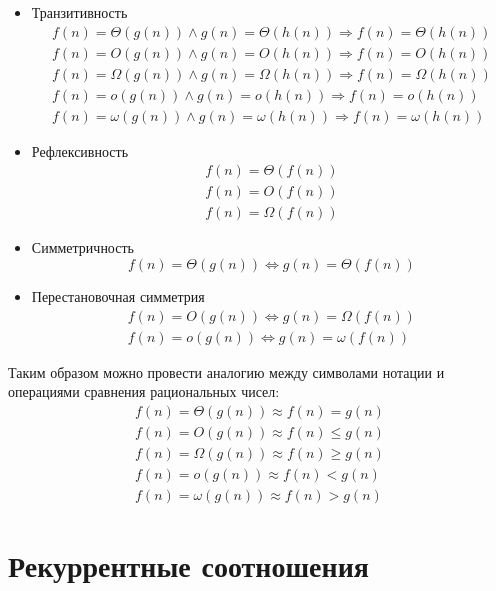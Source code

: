 \documentclass[11pt]{article}
\begin{document}
\begin{itemize}
\item Транзитивность
\begin{align*}
  f(n) = \Theta(g(n)) \land g(n) = \Theta(h(n)) \Rightarrow f(n) = \Theta(h(n)) \\
  f(n) = O(g(n)) \land g(n) = O(h(n)) \Rightarrow f(n) = O(h(n)) \\
  f(n) = \Omega(g(n)) \land g(n) = \Omega(h(n)) \Rightarrow f(n) = \Omega(h(n)) \\
  f(n) = o(g(n)) \land g(n) = o(h(n)) \Rightarrow f(n) = o(h(n)) \\
  f(n) = \omega(g(n)) \land g(n) = \omega(h(n)) \Rightarrow f(n) = \omega(h(n))
\end{align*}

\item Рефлексивность
\begin{align*}
  f(n) = \Theta(f(n)) \\
  f(n) = O(f(n)) \\
  f(n) = \Omega(f(n))
\end{align*}

\item Симметричность
\begin{equation*}
  f(n) = \Theta(g(n)) \iff g(n) = \Theta(f(n))
\end{equation*}

\item Перестановочная симметрия
\begin{align*}
  f(n) = O(g(n)) \iff g(n) = \Omega(f(n)) \\
  f(n) = o(g(n)) \iff g(n) = \omega(f(n))
\end{align*}
\end{itemize}

Таким образом можно провести аналогию между символами нотации и операциями
сравнения рациональных чисел:
\begin{align*}
  f(n) = \Theta(g(n)) \approx f(n) = g(n) \\
  f(n) = O(g(n)) \approx f(n) \leqslant  g(n) \\
  f(n) = \Omega(g(n)) \approx f(n) \geqslant g(n) \\
  f(n) = o(g(n)) \approx f(n) < g(n) \\
  f(n) = \omega(g(n)) \approx f(n) > g(n)
\end{align*}

\section{Рекуррентные соотношения}
\end{document}
